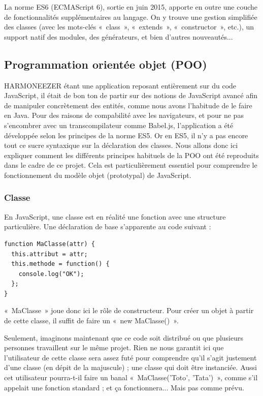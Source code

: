\documentclass[a4paper,12pt]{article}
\begin{document}
La norme ES6 (ECMAScript 6), sortie en juin 2015, apporte en outre une couche de fonctionnalités supplémentaires au langage. On y trouve une gestion simplifiée des classes (avec les mots-clés «~class~», «~extends~», «~constructor~», etc.), un support natif des modules, des générateurs, et bien d'autres nouveautés...

\subsection{Programmation orientée objet (POO)}

HARMONEEZER étant une application reposant entièrement sur du code JavaScript, il était de bon ton de partir sur des notions de JavaScript avancé afin de manipuler concrètement des entités, comme nous avons l'habitude de le faire en Java. Pour des raisons de compabilité avec les navigateurs, et pour ne pas s'encombrer avec un transcompilateur comme Babel.js, l'application a été développée selon les principes de la norme ES5. Or en ES5, il n'y a pas encore tout ce sucre syntaxique sur la déclaration des classes. Nous allons donc ici expliquer comment les différents principes habituels de la POO ont été reproduits dans le cadre de ce projet. Cela est particulièrement essentiel pour comprendre le fonctionnement du modèle objet (prototypal) de JavaScript.

\subsubsection{Classe}

En JavaScript, une classe est en réalité une fonction avec une structure particulière. Une déclaration de base s'apparente au code suivant :

\vspace{7pt}

\begin{lstlisting}
function MaClasse(attr) {
  this.attribut = attr;
  this.methode = function() {
    console.log("OK");
  };
}
\end{lstlisting}

«~MaClasse~» joue donc ici le rôle de constructeur. Pour créer un objet à partir de cette classe, il suffit de faire un «~new MaClasse()~».

Seulement, imaginons maintenant que ce code soit distribué ou que plusieurs personnes travaillent sur le même projet. Rien ne nous garantit ici que l'utilisateur de cette classe sera assez futé pour comprendre qu'il s'agit justement d'une classe (en dépit de la majuscule) ; une classe qui doit être instanciée. Aussi cet utilisateur pourra-t-il faire un banal «~MaClasse('Toto', 'Tata')~», comme s'il appelait une fonction standard ; et ça fonctionnera... Mais pas comme prévu.
\end{document}
